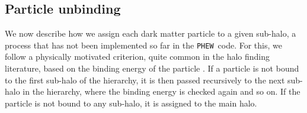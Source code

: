 \documentclass[a4paper,twocolumn,fleqn,usenatbib]{mnras}
\newcommand{\phew}{\texttt{PHEW}}
\begin{document}
\subsection{Particle unbinding}

We now describe how we assign each dark matter particle to a given
sub-halo, a process that has not been implemented so far in the
\phew\ code.  For this, we follow a physically motivated criterion,
quite common in the halo finding literature, based on the binding
energy of the particle \citep[e.g.][]{AHF, subfind, skid}.  If a
particle is not bound to the first sub-halo of the hierarchy, it is
then passed recursively to the next sub-halo in the hierarchy, where
the binding energy is checked again and so on.  If the particle is not
bound to any sub-halo, it is assigned to the main halo.
\end{document}
